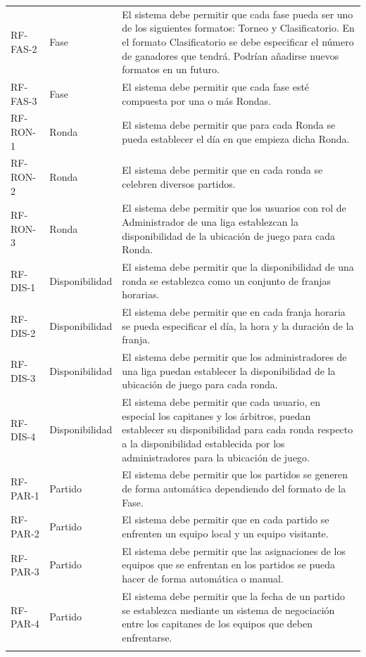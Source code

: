 {\begin{xltabular}{\textwidth}{>{\RaggedRight}p{1.7cm} p{1.8cm} >{\RaggedRight\arraybackslash}X}
        RF-FAS-2 & Fase & El sistema debe permitir que cada fase pueda ser uno de los siguientes formatos: Torneo y Clasificatorio. En el formato Clasificatorio se debe especificar el número de ganadores que tendrá. Podrían añadirse nuevos formatos en un futuro. \\ \lightrule
        RF-FAS-3 & Fase & El sistema debe permitir que cada fase esté compuesta por una o más Rondas. \\ \lightrule
        RF-RON-1 & Ronda & El sistema debe permitir que para cada Ronda se pueda establecer el día en que empieza dicha Ronda. \\ \lightrule
        RF-RON-2 & Ronda & El sistema debe permitir que en cada ronda se celebren diversos partidos. \\ \lightrule
        RF-RON-3 & Ronda & El sistema debe permitir que los usuarios con rol de Administrador de una liga establezcan la disponibilidad de la ubicación de juego para cada Ronda. \\ \lightrule
        RF-DIS-1 & Disponibilidad & El sistema debe permitir que la disponibilidad de una ronda se establezca como un conjunto de franjas horarias. \\ \lightrule
        RF-DIS-2 & Disponibilidad & El sistema debe permitir que en cada franja horaria se pueda especificar el día, la hora y la duración de la franja. \\ \lightrule
        RF-DIS-3 & Disponibilidad & El sistema debe permitir que los administradores de una liga puedan establecer la disponibilidad de la ubicación de juego para cada ronda. \\ \lightrule
        RF-DIS-4 & Disponibilidad & El sistema debe permitir que cada usuario, en especial los capitanes y los árbitros, puedan establecer su disponibilidad para cada ronda respecto a la disponibilidad establecida por los administradores para la ubicación de juego. \\ \lightrule
        RF-PAR-1 & Partido & El sistema debe permitir que los partidos se generen de forma automática dependiendo del formato de la Fase. \\ \lightrule
        RF-PAR-2 & Partido & El sistema debe permitir que en cada partido se enfrenten un equipo local y un equipo visitante. \\ \lightrule
        RF-PAR-3 & Partido & El sistema debe permitir que las asignaciones de los equipos que se enfrentan en los partidos se pueda hacer de forma automática o manual. \\ \lightrule
        RF-PAR-4 & Partido & El sistema debe permitir que la fecha de un partido se establezca mediante un sistema de negociación entre los capitanes de los equipos que deben enfrentarse. \\ \lightrule

\end{xltabular}}
